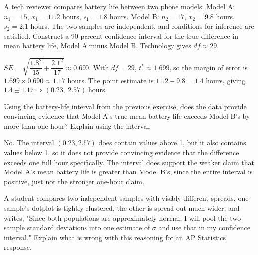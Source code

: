 \begin{Exercise}[title={Building a Two-Sample Interval}, label={ex:means-build}]
A tech reviewer compares battery life between two phone models. Model A: $n_1 = 15$, $\bar{x}_1 = 11.2$ hours, $s_1 = 1.8$ hours. Model B: $n_2 = 17$, $\bar{x}_2 = 9.8$ hours, $s_2 = 2.1$ hours. The two samples are independent, and conditions for inference are satisfied. Construct a 90 percent confidence interval for the true difference in mean battery life, Model A minus Model B. Technology gives $df \approx 29$.
\end{Exercise}

\begin{Answer}[ref={ex:means-build}]
$SE = \sqrt{\dfrac{1.8^2}{15} + \dfrac{2.1^2}{17}} \approx 0.690$. With $df = 29$, $t^* \approx 1.699$, so the margin of error is $1.699 \times 0.690 \approx 1.17$ hours. The point estimate is $11.2 - 9.8 = 1.4$ hours, giving $1.4 \pm 1.17 \Rightarrow (0.23,\ 2.57)$ hours.
\end{Answer}

\begin{Exercise}[title={Justifying a Claim}, label={ex:means-justify}]
Using the battery-life interval from the previous exercise, does the data provide convincing evidence that Model A's true mean battery life exceeds Model B's by more than one hour? Explain using the interval.
\end{Exercise}

\begin{Answer}[ref={ex:means-justify}]
No. The interval $(0.23, 2.57)$ does contain values above 1, but it also contains values below 1, so it does not provide convincing evidence that the difference exceeds one full hour specifically. The interval does support the weaker claim that Model A's mean battery life is greater than Model B's, since the entire interval is positive, just not the stronger one-hour claim.
\end{Answer}

\begin{Exercise}[title={Spot the Error}, label={ex:pooling-error}]
A student compares two independent samples with visibly different spreads, one sample's dotplot is tightly clustered, the other is spread out much wider, and writes, "Since both populations are approximately normal, I will pool the two sample standard deviations into one estimate of $\sigma$ and use that in my confidence interval." Explain what is wrong with this reasoning for an AP Statistics response.
\end{Exercise}

